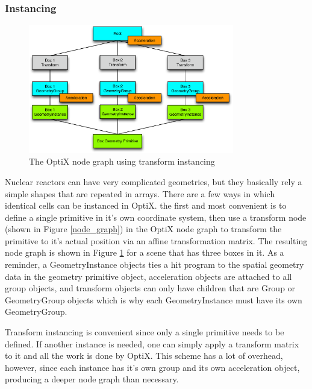 \subsubsection{Instancing}

\begin{figure}[h!] 
  \centering
    \includegraphics[width=0.8\textwidth]{graphics/transform_instancing.eps}
     \caption{The OptiX node graph using transform instancing \label{transform_instancing} }
\end{figure}

Nuclear reactors can have very complicated geometries, but they basically rely a simple shapes that are repeated in arrays.  There are a few ways in which identical cells can be instanced in OptiX.  the first and most convenient is to define a single primitive in it's own coordinate system, then use a transform node (shown in Figure \ref{node_graph}) in the OptiX node graph to transform the primitive to it's actual position via an affine transformation matrix.  The resulting node graph is shown in Figure \ref{transform_instancing} for a scene that has three boxes in it.  As a reminder, a GeometryInstance objects ties a hit program to the spatial geometry data in the geometry primitive object, acceleration objects are attached to all group objects, and transform objects can only have children that are Group or GeometryGroup objects which is why each GeometryInstance must have its own GeometryGroup.

Transform instancing is convenient since only a single primitive needs to be defined.  If another instance is needed, one can simply apply a transform matrix to it and all the work is done by OptiX.  This scheme has a lot of overhead, however, since each instance has it's own group and its own acceleration object, producing a deeper node graph than necessary.

